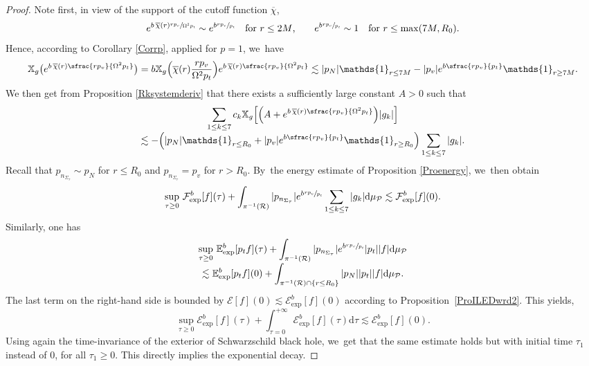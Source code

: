 \documentclass[10pt]{amsart}
\theoremstyle{plain}
\theoremstyle{definition}
\newcommand\T{{\mathbb{X}}}
\newcommand\dr{{\mathrm{d}}}
\begin{document}
\begin{proof}
Note first, in view of the support of the cutoff function $\overline{\chi}$,\vspace*{-3pt}
\[
e^{b \, \overline{\chi}(r) \sfrac{rp_v}{\Omega^2p_t}} \sim e^{b \sfrac{rp_v}{p_t}} \quad \text{for $r \leq 2M$,}\qquad e^{b \sfrac{rp_v}{p_t}} \sim 1 \quad \text{for $r \leq \max (7M,R_0)$}.
\]
Hence, according to Corollary \ref{Corrp}, applied for $p=1$, we~have\vspace*{-2pt}
\[
\T_g \bigl(e^{b \, \overline{\chi}(r) \sfrac{rp_v}{\Omega^2p_t}} \bigr) = b\T_g \Bigl(\overline{\chi}(r) \frac{rp_v}{\Omega^2p_t} \Bigr) e^{b \, \overline{\chi}(r) \sfrac{rp_v}{\Omega^2p_t}} \lesssim |p_N| \mathds{1}_{r \leq 7M} -|p_v| e^{b \sfrac{rp_v}{p_t}} \mathds{1}_{r \geq 7M}.
\]
We then get from Proposition \ref{Rksystemderiv} that there exists a sufficiently large constant $A>0$ such that
\begin{multline}
\sum_{1 \leq k \leq 7} c_k \T_g \Bigl[\Bigl(A+e^{b \, \overline{\chi}(r) \sfrac{rp_v}{\Omega^2p_t}} \Bigr)|g_k| \Bigr]\\[-3pt]
\lesssim -\Bigl(|p_N| \mathds{1}_{r \leq R_0} + |p_v|e^{b \sfrac{rp_v}{p_t}} \mathds{1}_{r \geq R_0} \Bigr) \sum_{1 \leq k \leq 7} |g_k|.
\end{multline}
Recall that $p_{n_{\Sigma_\tau}} \sim p_N$ for $r \leq R_0$ and $p_{n_{\Sigma_\tau}} = p_v$ for $r >R_0$. By~the energy estimate of Proposition \ref{Proenergy}, we~then obtain
\[
\sup_{\tau \geq 0}\, \mathcal{F}_{\mathrm{exp}}^b [f](\tau)+\int_{\pi^{-1}(\mathcal{R})} |p_{n_{\Sigma_\tau}}|e^{b \sfrac{rp_v}{p_t}} \sum_{1 \leq k \leq 7} |g_k| \dr \mu_{\mathcal{P}} \lesssim \mathcal{F}_{\mathrm{exp}}^b [f](0).
\]
Similarly, one has
\begin{multline*}
\sup_{\tau \geq 0} \,\mathbb{E}_{\mathrm{exp}}^b [p_t f](\tau)+\int_{\pi^{-1}(\mathcal{R})} |p_{n_{\Sigma_\tau}}|e^{b \sfrac{rp_v}{p_t}} |p_t| |f| \dr \mu_{\mathcal{P}} \\[-3pt]
\lesssim \mathbb{E}_{\mathrm{exp}}^b [p_tf](0)+\int_{\pi^{-1}(\mathcal{R})\cap \{ r \leq R_0 \}} |p_N| |p_t| |f| \dr \mu_{\mathcal{P}}.
\end{multline*}
The last term on the right-hand side is bounded by $\mathcal{E}[f](0) \lesssim \mathcal{E}_{\mathrm{exp}}^b[f](0)$ according to Proposition~\ref{ProILEDwrd2}. This yields,\vspace*{-3pt}
\[
\sup_{\tau \geq 0} \mathcal{E}_{\mathrm{exp}}^b [f](\tau)+\int_{\tau =0}^{+\infty} \mathcal{E}_{\mathrm{exp}}^b [f](\tau) \dr \tau \lesssim \mathcal{E}_{\mathrm{exp}}^b [f](0).
\]
Using again the time-invariance of the exterior of Schwarzschild black hole, we~get that the same estimate holds but with initial time $\tau_1$ instead of $0$, for all $\tau_1 \geq 0$. This directly implies the exponential decay.
\end{proof}
\end{document}
